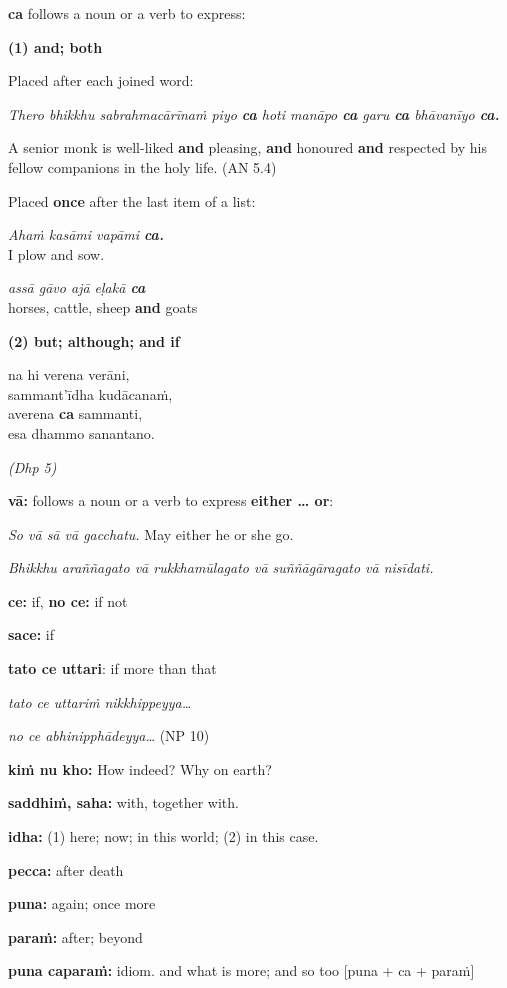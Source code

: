 \documentclass[11pt,oneside]{memoir}
\begin{document}
\begin{multicols}{2}

\textbf{ca} follows a noun or a verb to express:

\textbf{(1) and; both}

Placed after each joined word:

\emph{Thero bhikkhu sabrahmacārīnaṁ piyo \textbf{ca} hoti manāpo \textbf{ca} garu \textbf{ca} bhāvanīyo \textbf{ca.}}

A senior monk is well-liked \textbf{and} pleasing, \textbf{and} honoured \textbf{and} respected by his fellow companions in the holy life. (AN 5.4)

Placed \textbf{once} after the last item of a list:

\emph{Ahaṁ kasāmi vapāmi \textbf{ca.}} \\[0pt]
I plow and sow.

\emph{assā gāvo ajā eḷakā \textbf{ca}} \\[0pt]
horses, cattle, sheep \textbf{and} goats

\textbf{(2) but; although; and if}

na hi verena verāni,\\[0pt]
sammant'īdha kudācanaṁ,\\[0pt]
averena \textbf{ca} sammanti,\\[0pt]
esa dhammo sanantano.

\emph{(Dhp 5)}

\columnbreak

\textbf{vā:} follows a noun or a verb to express \textbf{either \ldots{} or}:

\emph{So vā sā vā gacchatu.} May either he or she go.

\emph{Bhikkhu araññagato vā rukkhamūlagato vā suññāgāragato vā nisīdati.}

\textbf{ce:} if, \textbf{no ce:} if not

\textbf{sace:} if

\textbf{tato ce uttari}: if more than that

\emph{tato ce uttariṁ nikkhippeyya\ldots{}}

\emph{no ce abhinipphādeyya\ldots{}} (NP 10)

\textbf{kiṁ nu kho:} How indeed? Why on earth?

\textbf{saddhiṁ, saha:} with, together with.

\textbf{idha:} (1) here; now; in this world; (2) in this case.

\textbf{pecca:} after death

\textbf{puna:} again; once more

\textbf{paraṁ:} after; beyond

\textbf{puna caparaṁ:} idiom. and what is more; and so too [puna + ca + paraṁ]

\end{multicols}
\end{document}
